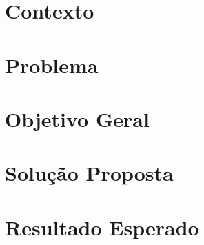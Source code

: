 \section{Contexto}

\section{Problema}

\section{Objetivo Geral}

\section{Solução Proposta}

\section{Resultado Esperado}

